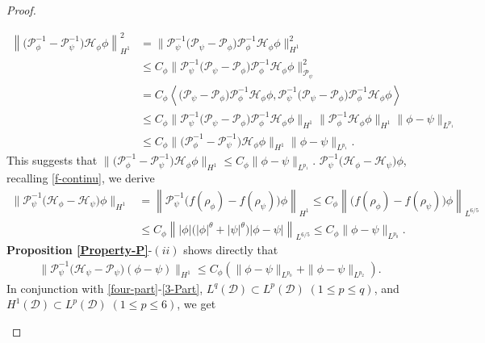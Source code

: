 \documentclass[preprint,3p]{elsarticle}
\begin{document}
\begin{proof}
\begin{itemize}[label={},left=0pt]
		\begin{align}\label{1-Part}
			\nonumber\left\|\big(\mathcal{P}_{\phi}^{-1}-\mathcal{P}_{\psi}^{-1}\big)\mathcal{H}_{\phi}\phi\right\|^2_{H^1}&=\big\|\mathcal{P}_{\psi}^{-1}\big(\mathcal{P}_{\psi}-\mathcal{P}_{\phi}\big)\mathcal{P}_{\phi}^{-1}\mathcal{H}_{\phi}\phi\big\|^2_{H^1}\\
			\nonumber&\le C_{\phi}\big\|\mathcal{P}_{\psi}^{-1}\big(\mathcal{P}_{\psi}-\mathcal{P}_{\phi}\big)\mathcal{P}_{\phi}^{-1}\mathcal{H}_{\phi}\phi\big\|^2_{\mathcal{P}_{\psi}}\\
			\nonumber&=C_{\phi}\left\langle\big(\mathcal{P}_{\psi}-\mathcal{P}_{\phi}\big)\mathcal{P}_{\phi}^{-1}\mathcal{H}_{\phi}\phi,\mathcal{P}_{\psi}^{-1}\big(\mathcal{P}_{\psi}-\mathcal{P}_{\phi}\big)\mathcal{P}_{\phi}^{-1}\mathcal{H}_{\phi}\phi\right\rangle\\
			\nonumber&\le C_{\phi} \big\|\mathcal{P}_{\psi}^{-1}\big(\mathcal{P}_{\psi}-\mathcal{P}_{\phi}\big)\mathcal{P}_{\phi}^{-1}\mathcal{H}_{\phi}\phi\big\|_{H^1}\big\|\mathcal{P}_{\phi}^{-1}\mathcal{H}_{\phi}\phi\big\|_{H^1}\|\phi-\psi\|_{L^{p_1}}\\
			&\le C_{\phi}\big\|\big(\mathcal{P}_{\phi}^{-1}-\mathcal{P}_{\psi}^{-1}\big)\mathcal{H}_{\phi}\phi\big\|_{H^1}\|\phi-\psi\|_{L^{p_1}}.
		\end{align}
		This suggests that $\big\|\big(\mathcal{P}_{\phi}^{-1}-\mathcal{P}_{\psi}^{-1}\big)\mathcal{H}_{\phi}\phi\big\|_{H^1}\le C_{\phi}\|\phi-\psi\|_{L^{p_1}}$.
		 $\mathcal{P}_{\psi}^{-1}\big(\mathcal{H}_{\phi}-\mathcal{H}_{\psi}\big)\phi$, recalling  \eqref{f-continu}, we derive
		\begin{align}\label{2-Part}
			\nonumber\big\|\mathcal{P}_{\psi}^{-1}\big(\mathcal{H}_{\phi}-\mathcal{H}_{\psi}\big)\phi\big\|_{H^1}&=	\left\|\mathcal{P}_{\psi}^{-1}\big(f(\rho_{\phi})-f(\rho_{\psi})\big)\phi\right\|_{H^1}\le C_{\phi}\left\|\big(f(\rho_{\phi})-f(\rho_{\psi})\big)\phi\right\|_{L^{6/5}}\\
			&\le C_{\phi}\left\||\phi|\big(|\phi|^{\theta}+|\psi|^{\theta}\big)|\phi-\psi|\right\|_{L^{6/5}}\le C_{\phi}\|\phi-\psi\|_{L^{p_0}}.
		\end{align}
		{\bf Proposition \ref{Property-P}}-$(ii)$ shows directly that
		\begin{align}\label{3-Part}
			\big\|\mathcal{P}_{\psi}^{-1}\big(\mathcal{H}_{\psi}-\mathcal{P}_{\psi}\big)(\phi-\psi)\big\|_{H^1}\le C_{\phi}\left(\|\phi-\psi\|_{L^{p_0}}+\|\phi-\psi\|_{L^{p_2}}\right).
		\end{align}
		In conjunction with \eqref{four-part}-\eqref{3-Part}, $L^q(\mathcal{D})\subset L^p(\mathcal{D})\; (1\le p\le q)$, and $H^1(\mathcal{D})\subset L^p(\mathcal{D})\; (1\le p\le6)$, we get 

\end{itemize}
\end{proof}
\end{document}
